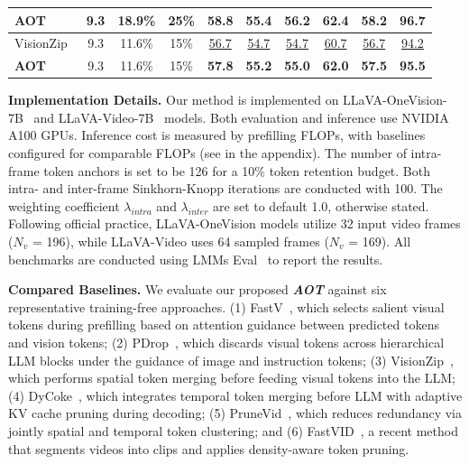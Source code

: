 \begin{table}[t]
{\begin{tabular}{l|ccc|cccc|cc}
 \textbf{AOT} & 9.3 & 18.9\% & 25\%
& \textbf{58.8}  & \textbf{55.4} & \textbf{56.2} & \textbf{62.4} & \textbf{58.2} & \textbf{96.7} \\ %

\hline

 VisionZip~\cite{yang2025visionzip} & 9.3 & 11.6\% & 15\%
& \underline{56.7} & \underline{54.7} & \underline{54.7} & \underline{60.7} & \underline{56.7} & \underline{94.2} \\ %

 \textbf{AOT} & 9.3 & 11.6\% & 15\%
& \textbf{57.8}  & \textbf{55.2} & \textbf{55.0} & \textbf{62.0} & \textbf{57.5} & \textbf{95.5} \\ %
\bottomrule



\end{tabular}
}%
\label{tab:diff_backbone}
\vspace{-0.4cm}
\end{table}



\noindent \textbf{Implementation Details.}
\label{sec:implementation_details}
Our method is implemented on LLaVA-OneVision-7B~\cite{li2024llava} and LLaVA-Video-7B~\cite{zhang2024video} models. Both evaluation and inference use NVIDIA A100 GPUs. Inference cost is measured by prefilling FLOPs, with baselines configured for comparable FLOPs (see in the appendix). The number of intra-frame token anchors is set to be 126 for a 10\% token retention budget. Both intra- and inter-frame Sinkhorn-Knopp iterations are conducted with 100. The weighting coefficient $\lambda_{intra}$ and $\lambda_{inter}$ are set to default 1.0, otherwise stated.
Following official practice, LLaVA-OneVision models utilize 32 input video frames ($N_v$ = 196), while LLaVA-Video uses 64 sampled frames ($N_v$ = 169). All benchmarks are conducted using LMMs Eval~\cite{zhang2025lmms,li2024lmms} to report the results.



\noindent \textbf{Compared Baselines.}
We evaluate our proposed \textbf{\textit{AOT}} against six representative training-free approaches.
(1) FastV~\cite{chen2024image}, which selects salient visual tokens during prefilling based on attention guidance between predicted tokens and vision tokens;
(2) PDrop~\cite{xing2024pyramiddrop}, which discards visual tokens across hierarchical LLM blocks under the guidance of image and instruction tokens;
(3) VisionZip~\cite{yang2025visionzip}, which performs spatial token merging before feeding visual tokens into the LLM;
(4) DyCoke~\cite{tao2025dycoke}, which integrates temporal token merging before LLM with adaptive KV cache pruning during decoding;
(5) PruneVid~\cite{huang2024prunevid}, which reduces redundancy via jointly spatial and temporal token clustering;
and (6) FastVID~\cite{shen2025fastvid}, a recent method that segments videos into clips and applies density-aware token pruning.



